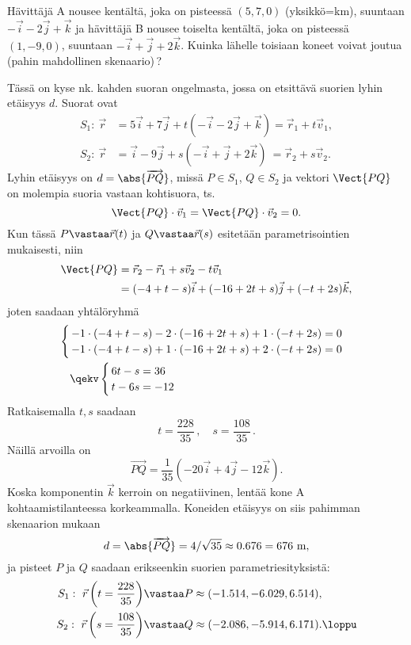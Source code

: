 \begin{Exa}
Hävittäjä A nousee kentältä, joka on pisteessä $(5,7,0)$ (yksikkö=km), suuntaan 
$-\vec i - 2\vec j + \vec k$ ja hävittäjä B nousee toiselta kentältä, joka on pisteessä 
$(1,-9,0)$, suuntaan $-\vec i + \vec j + 2\vec k$. Kuinka lähelle toisiaan koneet voivat joutua
(pahin mahdollinen skenaario)\,?
\end{Exa}
\ratk Tässä on kyse nk. kahden suoran ongelmasta, jossa on etsittävä suorien lyhin etäisyys $d$.
Suorat ovat
\begin{align*}
S_1: \ \vec r &= 5\vec i + 7\vec j + t(-\vec i - 2\vec j + \vec k) =\vec r_1+t\vec v_1, \\
S_2: \ \vec r &= \vec i - 9\vec j + s(-\vec i + \vec j + 2\vec k)\ =\vec r_2+s\vec v_2.
\end{align*}
Lyhin etäisyys on $d=\abs{\overrightarrow{PQ}}$, missä $P \in S_1$, $Q \in S_2$ ja 
vektori $\Vect{PQ}$ on molempia suoria vastaan kohtisuora, ts. 
\[
\Vect{PQ}\cdot\vec v_1=\Vect{PQ}\cdot\vec v_2=0.
\]
Kun tässä $P \vastaa \vec r(t)$ ja $Q \vastaa \vec r(s)$ esitetään parametrisointien
mukaisesti, niin
\begin{align*}
\Vect{PQ} &= \vec r_2-\vec r_1+s\vec v_2-t\vec v_1 \\
                    &= (-4+t-s)\vec i + (-16+2t+s)\vec j + (-t+2s)\vec k,
\end{align*}
joten saadaan yhtälöryhmä
\begin{align*} 
&\begin{cases}
\,-1\cdot(-4+t-s)-2\cdot(-16+2t+s)+1\cdot(-t+2s) = 0 \\
\,-1\cdot(-4+t-s)+1\cdot(-16+2t+s)+2\cdot(-t+2s) = 0
\end{cases} \\
&\quad\qekv \begin{cases}
             \,6t-s = 36 \\ \,t-6s = -12
            \end{cases}
\end{align*}
Ratkaisemalla $t,s$ saadaan
\[
t=\frac{228}{35}\,, \quad s=\frac{108}{35}\,.
\]
Näillä arvoilla on
\[
\overrightarrow{PQ} = \frac{1}{35}(-20\vec i+4\vec j-12\vec k).
\]
Koska komponentin $\vec k$ kerroin on negatiivinen, lentää kone A kohtaamistilanteessa 
korkeammalla. Koneiden etäisyys on siis pahimman skenaarion mukaan
\[
d=\abs{\overrightarrow{PQ}} = 4/ \sqrt{35} \approx 0.676 = 676 \text{ m},
\]
ja pisteet $P$ ja $Q$ saadaan erikseenkin suorien parametriesityksistä:
\begin{align*}
S_1:\ \vec r\left(t=\frac{228}{35}\right) &\vastaa P \approx (-1.514,-6.029,6.514), \\
S_2:\ \vec r\left(s=\frac{108}{35}\right) &\vastaa Q \approx (-2.086,-5.914,6.171). \loppu
\end{align*}

